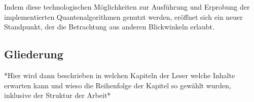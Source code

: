 Indem diese technologischen Möglichkeiten zur Ausführung und Erprobung der implementierten Quantenalgorithmen genutzt werden, 
eröffnet sich ein neuer Standpunkt, der die Betrachtung aus anderen Blickwinkeln erlaubt.


\subsection{Gliederung}
*Hier wird dann beschrieben in welchen Kapiteln der Leser welche Inhalte erwarten kann und wieso die Reihenfolge der Kapitel so gewählt wurden, inklusive der Struktur der Arbeit*


